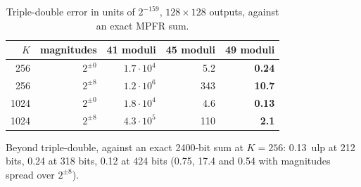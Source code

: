 \documentclass[11pt]{article}
\begin{document}
\begin{table}[h]\centering
\caption{Triple-double error in units of $2^{-159}$, $128\times128$ outputs, against an exact MPFR sum.}
\begin{tabular}{rrrrr}\toprule
$K$ & magnitudes & 41 moduli & 45 moduli & \textbf{49 moduli} \\\midrule
256 & $2^{\pm0}$ & $1.7\cdot10^4$ & 5.2 & \textbf{0.24} \\
256 & $2^{\pm8}$ & $1.2\cdot10^6$ & 343 & \textbf{10.7} \\
1024 & $2^{\pm0}$ & $1.8\cdot10^4$ & 4.6 & \textbf{0.13} \\
1024 & $2^{\pm8}$ & $4.3\cdot10^5$ & 110 & \textbf{2.1} \\\bottomrule
\end{tabular}
\end{table}
Beyond triple-double, against an exact 2400-bit sum at $K=256$: 0.13~ulp at 212 bits, 0.24 at 318 bits, 0.12 at 424 bits
(0.75, 17.4 and 0.54 with magnitudes spread over $2^{\pm8}$).
\end{document}

